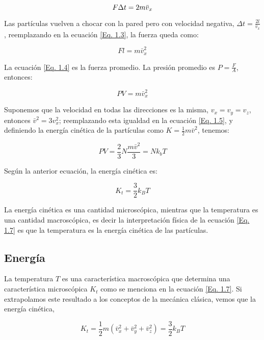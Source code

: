 \documentclass[11pt,fleqn]{book}
\begin{document}
\begin{equation}
    F \Delta t =2m\Bar{v}_{x}
    \label{Eq. 1.3}
\end{equation}

Las partículas vuelven a chocar con la pared pero con velocidad negativa, $\Delta t = \frac{2l}{\bar{v}_{x}}$, reemplazando en la ecuación \ref{Eq. 1.3}, la fuerza queda como:

\begin{equation}
   Fl=m\bar{v}_{x}^{2}
   \label{Eq. 1.4}
\end{equation}

La ecuación \ref{Eq. 1.4} es la fuerza promedio. La presión promedio es $P=\frac{F}{A}$, entonces:

\begin{equation}
PV=m\bar{v}_{x}^{2}
\label{Eq. 1.5}
\end{equation}

Suponemos que la velocidad en todas las direcciones es la misma, $v_{x}=v_{y}=v_{z}$, entonces $\bar{v}^{2}=3v_{x}^{2}$; reemplazando esta igualdad en la ecuación \ref{Eq. 1.5}, y definiendo la energía cinética de la partículas como $K=\frac{1}{2}m\bar{v}^{2}$, tenemos:

\begin{equation}
    PV=\frac{2}{3}N\frac{m\bar{v}^{2}}{3}=Nk_{b}T
    \label{Eq. 1.6}
\end{equation}

Según la anterior ecuación, la energía cinética es:

\begin{equation}
    K_{t}=\frac{3}{2}k_{B}T
    \label{Eq. 1.7}
\end{equation}

La energía cinética es una  cantidad microscópica, mientras que la temperatura es una cantidad macroscópica, es decir la interpretación física de la ecuación \ref{Eq. 1.7} es que la temperatura es la energía cinética de las partículas.

\subsection{Energía}

La temperatura $T$ es una característica macroscópica que determina una característica microscópica $K_{t}$ como se menciona en la ecuación \ref{Eq. 1.7}. Si extrapolamos este resultado a los conceptos de la mecánica clásica, vemos que la energía cinética,

\begin{equation}
    K_{t}=\frac{1}{2}m\left(\bar{v}_{x}^{2}+\bar{v}_{y}^{2}+\bar{v}_{z}^{2}\right)=\frac{3}{2}k_{B}T
    \label{Eq. 1.8}
\end{equation}
\end{document}
